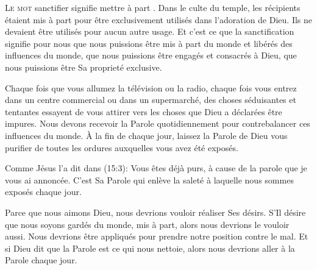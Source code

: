 \dvrule







\lettrine{L}{e mot} \Og sanctifier \Fg{} signifie \Og mettre à part \Fg{}.
 Dans le culte du temple, les récipients étaient mis à part pour être
 exclusivement utilisés dans l'adoration de Dieu.
 Ils ne devaient être utilisés pour aucun autre usage.
 Et c'est ce que la sanctification signifie pour nous
 \ocadr que nous puissions être mis à part du monde et libérés
 des influences du monde, que nous puissions être engagés et consacrés à Dieu,
 que nous puissions être Sa proprieté exclusive.


Chaque fois que vous allumez la télévision ou la radio,
 chaque fois vous entrez dans un centre commercial ou dans un supermarché,
 des choses séduisantes et tentantes essayent de vous attirer
 vers les choses que Dieu a déclarées être impures.
 Nous devons recevoir la Parole quotidiennement pour contrebalancer
 ces influences du monde. À la fin de chaque jour,
 laissez la Parole de Dieu vous purifier de toutes les ordures
 auxquelles vous avez été exposés.

Comme Jésus l'a dit dans (15:3): 
 \Og Vous êtes déjà purs, à cause de la parole que je vous ai annoncée. \Fg{}
 C'est Sa Parole qui enlève la saleté à laquelle nous sommes exposés chaque jour.

Parce que nous aimons Dieu, nous devrions vouloir réaliser Ses désirs.
 S'Il désire que nous soyons gardés du monde, mis à part,
 alors nous devrions le vouloir aussi. Nous devrions être appliqués
 pour prendre notre position contre le mal.
 Et si Dieu dit que la Parole est ce qui nous nettoie,
 alors nous devrions aller à la Parole chaque jour.

